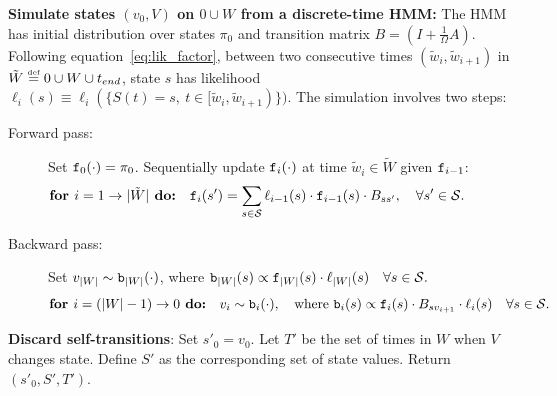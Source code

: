\begin{algorithm}[H]
\begin{algorithmic}[1]
  \State \textbf{ Simulate states $(v_0,V)$ on $0 \cup W$ from a discrete-time HMM:} 
The HMM has initial distribution over states $\pi_0$ and transition matrix $B = \left(I+\frac{1}{\Omega}A\right)$.
Following equation~\eqref{eq:lik_factor}, between two consecutive times $(\tilde{w}_i,\tilde{w}_{i+1})$ in $\tilde{W} \defeq 0 \cup W \cup t_{end}$, state $s$ has 
likelihood $\ell_i(s) \equiv \ell_i(\{S(t) = s,\ t \in [\tilde{w}_i,\tilde{w}_{i+1})\})$. The simulation involves two steps: 
\begin{description}
  \item[Forward pass:] 
    Set $\mathtt{f}_0(\cdot) = \pi_0$.
    Sequentially update $\mathtt{f}_i(\cdot)$ at time $\tilde{w}_i \in \tilde{W}$ given $\mathtt{f}_{i-1}$: 
        \vspace{-.1in}
        $$\textbf{for } i=1\rightarrow |\tilde{W}|\textbf{ do:} \quad \mathtt{f}_i(s') = \sum_{s \in {\mathcal S}} \ell_{i-1}(s) \cdot \mathtt{f}_{i-1}(s)\cdot B_{ss'}, \quad \forall s' \in {\mathcal S}.\qquad\qquad\quad $$
  \item[Backward pass:]
    Set ${v}_{|{W}|} \sim \mathtt{b}_{|{W}|}(\cdot)$, where $\mathtt{b}_{|{W}|}(s) \propto \mathtt{f}_{|{W}|}(s)\cdot\ell_{|{W}|}(s) \quad \forall s \in {\mathcal S}.$ 
    $$ \textbf{for } i=(|{W}|-1)\rightarrow 0\textbf{ do:} \quad {v}_i \sim \mathtt{b}_i(\cdot),\quad \text{where } 
    \mathtt{b}_i(s) \propto \mathtt{f}_i(s)\cdot B_{sv_{i+1}} \cdot \ell_i(s)  \quad \forall s \in {\mathcal S}.$$
\end{description}
        \vspace{-.1in}
\State \textbf{Discard self-transitions}: Set $s'_0 = v_0$. Let $T'$ be the set of times in ${W}$ when $V$ changes state. Define $S'$ as the corresponding set of state values. Return $(s'_0, S', T')$.
\end{algorithmic}
\end{algorithm}


